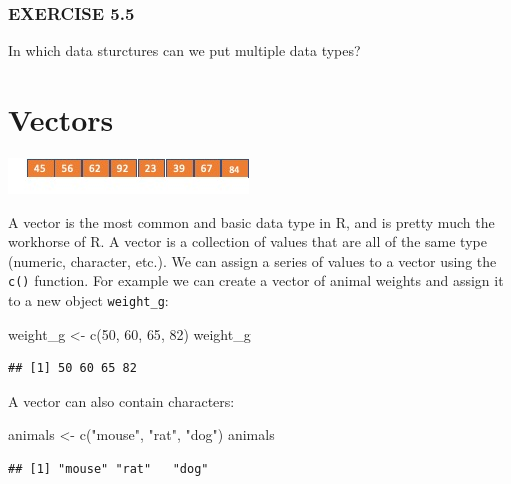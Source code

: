 \documentclass[
]{book}
\newenvironment{Shaded}{\begin{snugshade}}{\end{snugshade}}
\newcommand{\DecValTok}[1]{\textcolor[rgb]{0.00,0.00,0.81}{#1}}
\newcommand{\FunctionTok}[1]{\textcolor[rgb]{0.00,0.00,0.00}{#1}}
\newcommand{\NormalTok}[1]{#1}
\newcommand{\OtherTok}[1]{\textcolor[rgb]{0.56,0.35,0.01}{#1}}
\newcommand{\StringTok}[1]{\textcolor[rgb]{0.31,0.60,0.02}{#1}}
\begin{document}
\hypertarget{exercise-5.5}{%
\subsubsection*{EXERCISE 5.5}\label{exercise-5.5}}

In which data sturctures can we put multiple data types?

\hypertarget{vectors}{%
\section{Vectors}\label{vectors}}

\includegraphics{vec1.jpg}

A vector is the most common and basic data type in R, and is pretty much the workhorse of R. A vector is a collection of values that are all of the same type (numeric, character, etc.). We can assign a series of values to a vector using the \texttt{c()} function. For example we can create a vector of animal weights and assign it to a new object \texttt{weight\_g}:

\begin{Shaded}
\begin{Highlighting}[]
\NormalTok{weight\_g }\OtherTok{\textless{}{-}} \FunctionTok{c}\NormalTok{(}\DecValTok{50}\NormalTok{, }\DecValTok{60}\NormalTok{, }\DecValTok{65}\NormalTok{, }\DecValTok{82}\NormalTok{)}
\NormalTok{weight\_g}
\end{Highlighting}
\end{Shaded}

\begin{verbatim}
## [1] 50 60 65 82
\end{verbatim}

A vector can also contain characters:

\begin{Shaded}
\begin{Highlighting}[]
\NormalTok{animals }\OtherTok{\textless{}{-}} \FunctionTok{c}\NormalTok{(}\StringTok{"mouse"}\NormalTok{, }\StringTok{"rat"}\NormalTok{, }\StringTok{"dog"}\NormalTok{)}
\NormalTok{animals}
\end{Highlighting}
\end{Shaded}

\begin{verbatim}
## [1] "mouse" "rat"   "dog"
\end{verbatim}
\end{document}
